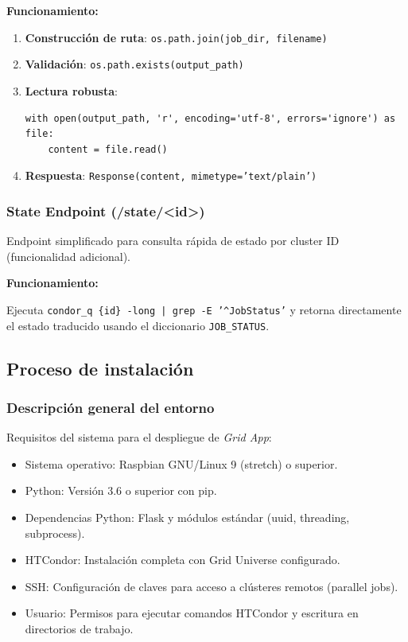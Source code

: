 \textbf{Funcionamiento:}

\begin{enumerate}
	\item \textbf{Construcción de ruta}: \texttt{os.path.join(job\_dir, filename)}

	\item \textbf{Validación}: \texttt{os.path.exists(output\_path)}

	\item \textbf{Lectura robusta}: 
	      \begin{verbatim}
with open(output_path, 'r', encoding='utf-8', errors='ignore') as file:
    content = file.read()
	      \end{verbatim}

	\item \textbf{Respuesta}: \texttt{Response(content, mimetype='text/plain')}
\end{enumerate}

\subsubsection{State Endpoint (/state/<id>)}
\noindent

Endpoint simplificado para consulta rápida de estado por cluster ID (funcionalidad adicional).

\textbf{Funcionamiento:}

Ejecuta \texttt{condor\_q \{id\} -long | grep -E '\^{}JobStatus'} y retorna directamente el estado traducido usando el diccionario \texttt{JOB\_STATUS}.

\subsection{Proceso de instalación}
\noindent

\subsubsection{Descripción general del entorno}
\noindent
Requisitos del sistema para el despliegue de \textit{Grid App}:

\begin{itemize}
	\item Sistema operativo: Raspbian GNU/Linux 9 (stretch) o superior.
	\item Python: Versión 3.6 o superior con pip.
	\item Dependencias Python: Flask y módulos estándar (uuid, threading, subprocess).
	\item HTCondor: Instalación completa con Grid Universe configurado.
	\item SSH: Configuración de claves para acceso a clústeres remotos (parallel jobs).
	\item Usuario: Permisos para ejecutar comandos HTCondor y escritura en directorios de trabajo.
\end{itemize}

